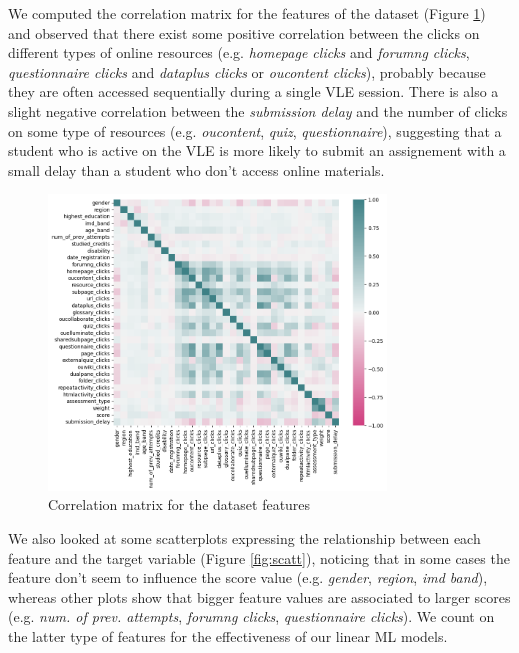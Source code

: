 \documentclass{article}
\begin{document}
We computed the correlation matrix for the features of the dataset (Figure \ref{fig:corrmatr}) and observed that there exist some positive correlation between the clicks on different types of online resources (e.g. \textit{homepage clicks} and \textit{forumng clicks}, \textit{questionnaire clicks} and \textit{dataplus clicks} or \textit{oucontent clicks}), probably because they are often accessed sequentially during a single VLE session. There is also a slight negative correlation between the \textit{submission delay} and the number of clicks on some type of resources (e.g. \textit{oucontent}, \textit{quiz}, \textit{questionnaire}), suggesting that a student who is active on the VLE is more likely to submit an assignement with a small delay than a student who don't access online materials.\\

\begin{figure}
\centering
\includegraphics[width=0.8\textwidth]{correlationmatrix.png}
\caption{\label{fig:corrmatr}Correlation matrix for the dataset features}
\end{figure}

We also looked at some scatterplots expressing the relationship between each feature and the target variable (Figure \ref{fig:scatt}), noticing that in some cases the feature don't seem to influence the score value (e.g. \textit{gender}, \textit{region}, \textit{imd band}), whereas other plots show that bigger feature values are associated to larger scores (e.g. \textit{num. of prev. attempts}, \textit{forumng clicks}, \textit{questionnaire clicks}). We count on the latter type of features for the effectiveness of our linear ML models.\\
\end{document}
